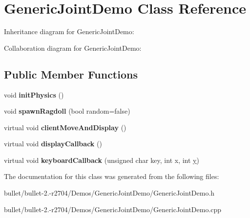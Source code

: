 \hypertarget{class_generic_joint_demo}{\section{Generic\+Joint\+Demo Class Reference}
\label{class_generic_joint_demo}
}


Inheritance diagram for Generic\+Joint\+Demo\+:


Collaboration diagram for Generic\+Joint\+Demo\+:
\subsection*{Public Member Functions}
\begin{DoxyCompactItemize}
\item 
\hypertarget{class_generic_joint_demo_a3cbd48e63f28dbeb3803839b89c3d585}{void {\bfseries init\+Physics} ()}\label{class_generic_joint_demo_a3cbd48e63f28dbeb3803839b89c3d585}

\item 
\hypertarget{class_generic_joint_demo_a585ea349a562275c3e3e7ab8e2e5bd8c}{void {\bfseries spawn\+Ragdoll} (bool random=false)}\label{class_generic_joint_demo_a585ea349a562275c3e3e7ab8e2e5bd8c}

\item 
\hypertarget{class_generic_joint_demo_ad349de81a78a7b588acf15a87b58d0c2}{virtual void {\bfseries client\+Move\+And\+Display} ()}\label{class_generic_joint_demo_ad349de81a78a7b588acf15a87b58d0c2}

\item 
\hypertarget{class_generic_joint_demo_a5710423866a8262cecc6109c9c8c268e}{virtual void {\bfseries display\+Callback} ()}\label{class_generic_joint_demo_a5710423866a8262cecc6109c9c8c268e}

\item 
\hypertarget{class_generic_joint_demo_a9c5d06e3ce44487667cb415176bdfac5}{virtual void {\bfseries keyboard\+Callback} (unsigned char key, int x, int \hyperlink{_ice_utils_8h_aa7ffaed69623192258fb8679569ff9ba}{y})}\label{class_generic_joint_demo_a9c5d06e3ce44487667cb415176bdfac5}

\end{DoxyCompactItemize}


The documentation for this class was generated from the following files\+:\begin{DoxyCompactItemize}
\item 
bullet/bullet-\/2.-\/r2704/\+Demos/\+Generic\+Joint\+Demo/Generic\+Joint\+Demo.\+h\item 
bullet/bullet-\/2.-\/r2704/\+Demos/\+Generic\+Joint\+Demo/Generic\+Joint\+Demo.\+cpp\end{DoxyCompactItemize}
